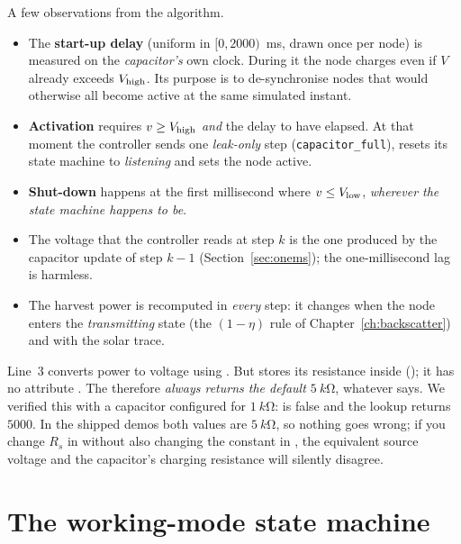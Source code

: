 A few observations from the algorithm.
\begin{itemize}
 \item The \textbf{start-up delay} (uniform in $[0,2000)$~ms, drawn once per node) is measured on the \emph{capacitor's} own clock. During it the node charges even if $V$ already exceeds $V_{\mathrm{high}}$. Its purpose is to de-synchronise nodes that would otherwise all become active at the same simulated instant.
 \item \textbf{Activation} requires $v\ge V_{\mathrm{high}}$ \emph{and} the delay to have elapsed. At that moment the controller sends one \emph{leak-only} step (\texttt{capacitor\_full}), resets its state machine to \emph{listening} and sets the node active.
 \item \textbf{Shut-down} happens at the first millisecond where $v\le V_{\mathrm{low}}$, \emph{wherever the state machine happens to be}.
 \item The voltage that the controller reads at step $k$ is the one produced by the capacitor update of step $k-1$ (Section~\ref{sec:onems}); the one-millisecond lag is harmless.
 \item The harvest power is recomputed in \emph{every} step: it changes when the node enters the \emph{transmitting} state (the $(1-\eta)$ rule of Chapter~\ref{ch:backscatter}) and with the solar trace.
\end{itemize}

\begin{reality}
Line~3 converts power to voltage using . But  stores its resistance inside  (); it has no attribute . The  therefore \emph{always returns the default $\SI{5}{k\ohm}$}, whatever  says. We verified this with a capacitor configured for $\SI{1}{k\ohm}$:  is false and the lookup returns $5000$. In the shipped demos both values are $\SI{5}{k\ohm}$, so nothing goes wrong; if you change $R_s$ in  without also changing the constant in , the equivalent source voltage and the capacitor's charging resistance will silently disagree.
\end{reality}

\section{The working-mode state machine}
\label{sec:fsm}

